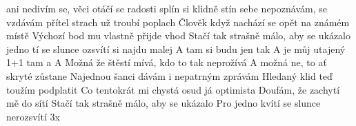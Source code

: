 
\zs
{} ani nedivím se,  věci otáčí se
radosti splín si klidně  stín
 sebe nepoznávám,  se vzdávám
 přítel strach už troubí  poplach
\ks
\zs
Člověk když nachází se opět na známém místě
Výchozí bod mu vlastně přijde vhod
Stačí tak strašně málo, aby se ukázalo
 jedno tí se slunce ozsvítí
\ks
\zr
{} si najdu malej 
A tam si budu jen tak 
A 
 je můj utajený 
1+1 tam a 
A 
\kr
\zs
Možná že štěstí mívá, kdo to tak neprožívá
A možná ne, to ať skryté zůstane
Najednou šanci dávám i nepatrným zprávám
Hledaný klid teď toužím podplatit
\ks
\zs
Co tentokrát mi chystá osud já optimista
Doufám, že zachytí mě do sítí
Stačí tak strašně málo, aby se ukázalo
Pro jedno kvítí se slunce nerozsvítí
\ks
\zr 3x
\kr
\kp



